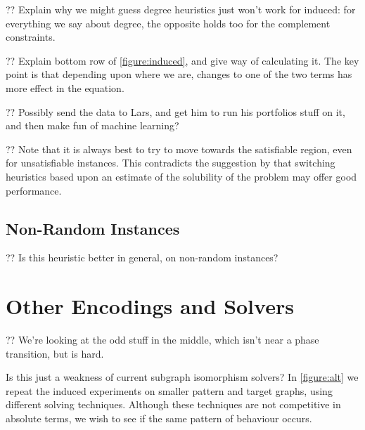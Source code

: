 \documentclass[letterpaper]{article}
\begin{document}
?? Explain why we might guess degree heuristics just won't work for induced: for everything we say
about degree, the opposite holds too for the complement constraints.

?? Explain bottom row of \cref{figure:induced}, and give way of calculating it. The key point is
that depending upon where we are, changes to one of the two terms has more effect in the equation.

?? Possibly send the data to Lars, and get him to run his portfolios stuff on it, and then make fun
of machine learning?

?? Note that it is always best to try to move towards the satisfiable region, even for unsatisfiable
instances. This contradicts the suggestion by \citet{Walsh:1998} that switching heuristics based
upon an estimate of the solubility of the problem may offer good performance.

\subsection{Non-Random Instances}

?? Is this heuristic better in general, on non-random instances?

\section{Other Encodings and Solvers}

\begin{figure*}[t]
    
    \caption{Behaviour of other solvers on the induced variant on smaller graphs, shown in the style of
        \cref{figure:non-induced}. The second row shows the number of search nodes used by the
    Glasgow algorithm, the third row shows the number of decisions made by the Clasp pseudo-boolean
solver, and the fourth row shows the number of search nodes used by BBMC on the clique
encoding.}\label{figure:alt}
\end{figure*}

?? We're looking at the odd stuff in the middle, which isn't near a phase transition, but is hard.

Is this just a weakness of current subgraph isomorphism solvers? In \cref{figure:alt} we repeat the
induced experiments on smaller pattern and target graphs, using different solving techniques.
Although these techniques are not competitive in absolute terms, we wish to see if the same pattern
of behaviour occurs.
\end{document}
